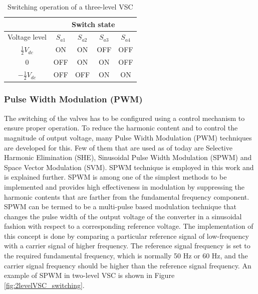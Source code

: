 \begin{table}[H]
\centering
\begin{tabular}{c|c|c|c|c|}
\cline{2-5}
                                          & \multicolumn{4}{c|}{Switch state}     \\ \hline
\multicolumn{1}{|c|}{Voltage level}       & $S_{a1}$ & $S_{a2}$ & $S_{a3}$ & $S_{a4}$ \\ \hline
\multicolumn{1}{|c|}{$\frac{1}{2}V_{dc}$}  & ON      & ON      & OFF     & OFF     \\ \hline
\multicolumn{1}{|c|}{0}                   & OFF     & ON      & ON      & OFF     \\ \hline
\multicolumn{1}{|c|}{$-\frac{1}{2}V_{dc}$} & OFF     & OFF     & ON      & ON      \\ \hline
\end{tabular}
\caption{Switching operation of a three-level VSC \cite{noauthor_appendix_2014-1}}
\label{tab:3level_switching}
\end{table}

\subsubsection{Pulse Width Modulation (PWM)}
The switching of the valves has to be configured using a control mechanism to ensure proper operation. To reduce the harmonic content and to control the magnitude of output voltage, many Pulse Width Modulation (\gls{PWM}) techniques are developed for this. Few of them that are used as of today are Selective Harmonic Elimination (SHE), Sinusoidal Pulse Width Modulation (SPWM) and Space Vector Modulation (SVM). SPWM technique is employed in this work and is explained further. SPWM is among one of the simplest methods to be implemented and provides high effectiveness in modulation by suppressing the harmonic contents that are farther from the fundamental frequency component. SPWM can be termed to be a multi-pulse based modulation technique that changes the pulse width of the output voltage of the converter in a sinusoidal fashion with respect to a corresponding reference voltage. The implementation of this concept is done by comparing a particular reference signal of low-frequency with a carrier signal of higher frequency. The reference signal frequency is set to the required fundamental frequency, which is normally 50 Hz or 60 Hz, and the carrier signal frequency should be higher than the reference signal frequency. An example of SPWM in two-level \gls{VSC} is shown in Figure \ref{fig:2levelVSC_switching}.

